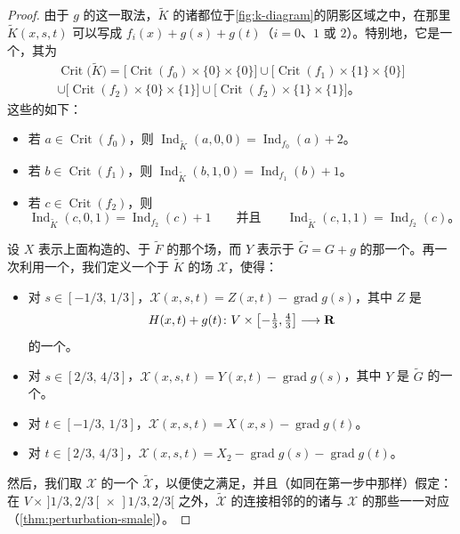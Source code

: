 \begin{proof}
由于 $g$ 的这一取法，$\widetilde{K}$ 的诸\trCriticalPoint{}都位于\cref{fig:k-diagram}的阴影区域之中，在那里 $\widetilde{K}(x,s,t)$ 可以写成 $f_i(x)+g(s)+g(t)$（$i=0$、$1$ 或 $2$）。特别地，它是一个\trMorseFunction，其\trCriticalPoint{}为
\[
\begin{aligned}
\operatorname{Crit}\bigl(\widetilde{K}\bigr)
  =\bigl[\operatorname{Crit}(f_0)\times\{0\}\times\{0\}\bigr]
   \cup\bigl[\operatorname{Crit}(f_1)\times\{1\}\times\{0\}\bigr]\\
  \cup\bigl[\operatorname{Crit}(f_2)\times\{0\}\times\{1\}\bigr]
   \cup\bigl[\operatorname{Crit}(f_2)\times\{1\}\times\{1\}\bigr]\text{。}
\end{aligned}
\]
这些\trCriticalPoint{}的\trIndex{}如下：
\begin{itemize}
\item 若 $a\in\operatorname{Crit}(f_0)$，则 $\operatorname{Ind}_{\widetilde{K}}(a,0,0)=\operatorname{Ind}_{f_0}(a)+2$。
\item 若 $b\in\operatorname{Crit}(f_1)$，则 $\operatorname{Ind}_{\widetilde{K}}(b,1,0)=\operatorname{Ind}_{f_1}(b)+1$。
\item 若 $c\in\operatorname{Crit}(f_2)$，则
\[
\operatorname{Ind}_{\widetilde{K}}(c,0,1)=\operatorname{Ind}_{f_2}(c)+1
\qquad\text{并且}\qquad
\operatorname{Ind}_{\widetilde{K}}(c,1,1)=\operatorname{Ind}_{f_2}(c)\text{。}
\]
\end{itemize}

设 $X$ 表示上面构造的、\trAdapted{}于 $\widetilde{F}$ 的那个\trPseudogradient{}场，而 $Y$ 表示\trAdapted{}于 $\widetilde{G}=G+g$ 的那一个。再一次利用一个\trPartitionOfUnity，我们定义一个\trAdapted{}于 $\widetilde{K}$ 的\trPseudogradient{}场 $\mathcal{X}$，使得：
\begin{itemize}
\item 对 $s\in[-1/3,\,1/3]$，$\mathcal{X}(x,s,t)=Z(x,t)-\operatorname{grad}g(s)$，其中 $Z$ 是
\[
H(x,t)+g(t)\colon V\times\bigl[-\tfrac{1}{3},\tfrac{4}{3}\bigr]\longrightarrow\mathbf{R}
\]
的一个\trPseudogradient。
\item 对 $s\in[2/3,\,4/3]$，$\mathcal{X}(x,s,t)=Y(x,t)-\operatorname{grad}g(s)$，其中 $Y$ 是 $\widetilde{G}$ 的一个\trPseudogradient。
\item 对 $t\in[-1/3,\,1/3]$，$\mathcal{X}(x,s,t)=X(x,s)-\operatorname{grad}g(t)$。
\item 对 $t\in[2/3,\,4/3]$，$\mathcal{X}(x,s,t)=X_2-\operatorname{grad}g(s)-\operatorname{grad}g(t)$。
\end{itemize}

然后，我们取 $\mathcal{X}$ 的一个\trPerturbation{} $\widetilde{\mathcal{X}}$，以便使之满足\trSmaleCondition，并且（如同在第一步中那样）假定：在 $V\times\,]1/3,2/3[\,\times\,]1/3,2/3[$ 之外，$\widetilde{\mathcal{X}}$ 的连接\trIndex{}相邻的\trCriticalPoint{}的诸\trTrajectory{}与 $\mathcal{X}$ 的那些\trTrajectory{}一一对应（\cref{thm:perturbation-smale}）。


\end{proof}
